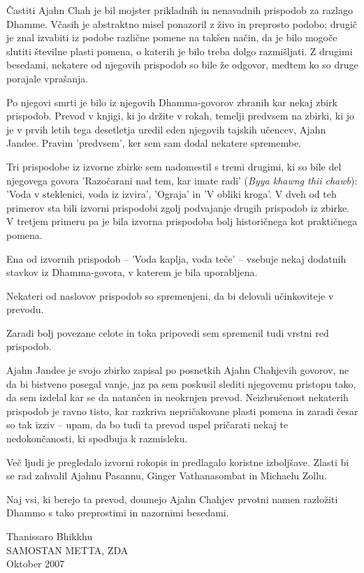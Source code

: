 
Častiti Ajahn Chah je bil mojster prikladnih in nenavadnih prispodob za razlago Dhamme. Včasih je abstraktno misel ponazoril z živo in preprosto podobo; drugič je znal izvabiti iz podobe različne pomene na takšen način, da je bilo mogoče slutiti številne plasti pomena, o katerih je bilo treba dolgo razmišljati. Z drugimi besedami, nekatere od njegovih prispodob so bile že odgovor, medtem ko so druge porajale vprašanja.

Po njegovi smrti je bilo iz njegovih Dhamma-govorov zbranih kar nekaj zbirk prispodob. Prevod v knjigi, ki jo držite v rokah, temelji predvsem na zbirki, ki jo je v prvih letih tega desetletja uredil eden njegovih tajskih učencev, Ajahn Jandee. Pravim 'predvsem', ker sem sam dodal nekatere spremembe.

Tri prispodobe iz izvorne zbirke sem nadomestil s tremi drugimi, ki so bile del njegovega govora 'Razočarani nad tem, kar imate radi' (\emph{Byya khawng thii chawb}): 'Voda v steklenici, voda iz izvira', 'Ograja' in 'V obliki kroga'.  V dveh od teh primerov sta bili izvorni prispodobi zgolj podvajanje drugih prispodob iz zbirke. V tretjem primeru pa je bila izvorna prispodoba bolj historičnega kot praktičnega pomena.

Ena od izvornih prispodob – 'Voda kaplja, voda teče' – vsebuje nekaj dodatnih stavkov iz Dhamma-govora, v katerem je bila uporabljena.

Nekateri od naslovov prispodob so spremenjeni, da bi delovali učinkoviteje v prevodu.

Zaradi bolj povezane celote in toka pripovedi sem spremenil tudi vrstni red prispodob.

Ajahn Jandee je svojo zbirko zapisal po posnetkih Ajahn Chahjevih govorov, ne da bi bistveno posegal vanje, jaz pa sem poskusil slediti njegovemu pristopu tako, da sem izdelal kar se da natančen in neokrnjen prevod. Neizbrušenost nekaterih prispodob je ravno tisto, kar razkriva nepričakovane plasti pomena in zaradi česar so tak izziv – upam, da bo tudi ta prevod uspel pričarati nekaj te nedokončanosti, ki spodbuja k razmisleku.

Več ljudi je pregledalo izvorni rokopis in predlagalo koristne izboljšave. Zlasti bi se rad zahvalil Ajahnu Pasannu, Ginger Vathanasombat in Michaelu Zollu.

Naj vsi, ki berejo ta prevod, doumejo Ajahn Chahjev prvotni namen razložiti Dhammo s tako preprostimi in nazornimi besedami.

\vfill

{\par\raggedleft
Thanissaro Bhikkhu\\
SAMOSTAN METTA, ZDA\\
Oktober 2007
\par}
